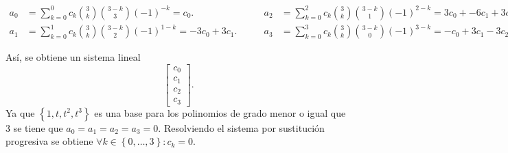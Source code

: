 \begin{frame}
\begin{solution}
        \begin{equation*}
            \begin{aligned}
                a_{0} & =
                \sum_{k=0}^{0}
                c_{k}
                \binom{3}{k}
                \binom{3-k}{3}
                {\left(-1\right)}^{-k}=
                c_{0}.    \\
                a_{1} & =
                \sum_{k=0}^{1}
                c_{k}
                \binom{3}{k}
                \binom{3-k}{2}
                {\left(-1\right)}^{1-k}=
                -3c_{0}+3c_{1}.
            \end{aligned}
            \qquad
            \begin{aligned}
                a_{2} & =
                \sum_{k=0}^{2}
                c_{k}
                \binom{3}{k}
                \binom{3-k}{1}
                {\left(-1\right)}^{2-k}=
                3c_{0}+-6c_{1}+3c_{2}. \\
                a_{3} & =
                \sum_{k=0}^{3}
                c_{k}
                \binom{3}{k}
                \binom{3-k}{0}
                {\left(-1\right)}^{3-k}=
                -c_{0}+3c_{1}-3c_{2}+c_{3}.
            \end{aligned}
        \end{equation*}
    \end{solution}
\end{frame}

\begin{frame}
    Así, se obtiene un sistema lineal
    \begin{equation*}
        \begin{bmatrix}
            c_{0} \\
            c_{1} \\
            c_{2} \\
            c_{3}
        \end{bmatrix}.
    \end{equation*}
    Ya que
    \begin{math}
        \left\{
        1,
        t,
        t^{2},
        t^{3}
        \right\}
    \end{math}
    es una base para los polinomios de grado menor o igual que
    $3$ se tiene que
    \begin{math}
        a_{0}=
        a_{1}=
        a_{2}=
        a_{3}=
        0
    \end{math}.
    Resolviendo el sistema por sustitución progresiva se obtiene
    \begin{math}
        \forall k\in\left\{0,\dotsc,3\right\}:
        c_{k}=0
    \end{math}.
\end{frame}
